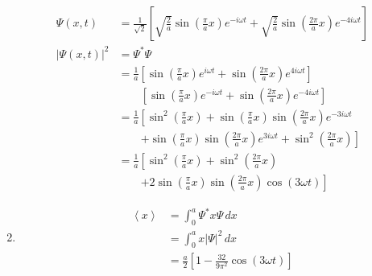 \documentclass{article}
\newcommand{\ev}[1]{\left< #1 \right>}
\begin{document}
\begin{enumerate}
        \begin{align*}
          \Psi(x, t)     & = \frac{1}{\sqrt{2}} \left[ \sqrt{\frac{2}{a}} \sin \left( \frac{\pi}{a} x \right) e^{-i \omega t} + \sqrt{\frac{2}{a}} \sin \left( \frac{2 \pi}{a} x \right) e^{-4 i \omega t} \right] \\
          |\Psi(x, t)|^2 & = \Psi^* \Psi                                                                                                                                                                           \\
                         & = \frac{1}{a} \left[ \sin \left( \frac{\pi}{a} x \right) e^{i \omega t} + \sin \left( \frac{2 \pi}{a} x \right) e^{4 i \omega t} \right]                                                \\
                         & \qquad \left[ \sin \left( \frac{\pi}{a} x \right) e^{-i \omega t} + \sin \left( \frac{2 \pi}{a} x \right) e^{-4 i \omega t} \right]                                                     \\
                         & = \frac{1}{a} \left[ \sin^2 \left( \frac{\pi}{a} x \right) + \sin \left( \frac{\pi}{a} x \right) \sin \left( \frac{2 \pi}{a} x \right) e^{-3 i \omega t} \right.                        \\
                         & \qquad \left. + \sin \left( \frac{\pi}{a} x \right) \sin \left( \frac{2 \pi}{a} x \right) e^{3 i \omega t} + \sin^2 \left( \frac{2 \pi}{a} x \right) \right]                            \\
                         & = \frac{1}{a} \left[ \sin^2 \left( \frac{\pi}{a} x \right) + \sin^2 \left( \frac{2 \pi}{a} x \right) \right.                                                                            \\
                         & \qquad \left. + 2 \sin \left( \frac{\pi}{a} x \right) \sin \left( \frac{2 \pi}{a} x \right) \cos (3 \omega t) \right]
        \end{align*}

  \item

        \begin{align*}
          \ev{x} & = \int_0^a \Psi^* x \Psi \,d x                                        \\
                 & = \int_0^a x |\Psi|^2 \,d x                                           \\
                 & = \frac{a}{2} \left[ 1 - \frac{32}{9 \pi^2} \cos (3 \omega t) \right]
        \end{align*}


\end{enumerate}
\end{document}
